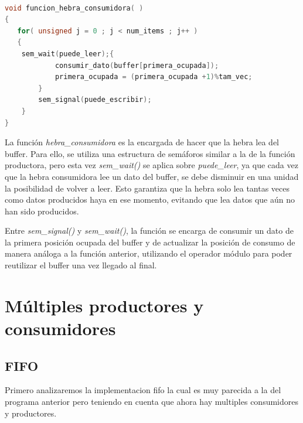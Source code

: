 \documentclass{article}
\begin{document}
\begin{lstlisting}[language=C++,caption=función hebra consumidora ]

void funcion_hebra_consumidora( )
{
   for( unsigned j = 0 ; j < num_items ; j++ )
   {
	sem_wait(puede_leer);{
	        consumir_dato(buffer[primera_ocupada]);
			primera_ocupada = (primera_ocupada +1)%tam_vec;
		}
		sem_signal(puede_escribir);
    }
}
\end{lstlisting}

La función \textit{hebra\_consumidora} es la encargada de hacer que la hebra lea del buffer. Para ello, se utiliza una estructura de semáforos similar a la de la función productora, pero esta vez \textit{sem\_wait()} se aplica sobre \textit{puede\_leer}, ya que cada vez que la hebra consumidora lee un dato del buffer, se debe disminuir en una unidad la posibilidad de volver a leer. Esto garantiza que la hebra solo lea tantas veces como datos producidos haya en ese momento, evitando que lea datos que aún no han sido producidos.

Entre \textit{sem\_signal()} y \textit{sem\_wait()}, la función se encarga de consumir un dato de la primera posición ocupada del buffer y de actualizar la posición de consumo de manera análoga a la función anterior, utilizando el operador módulo para poder reutilizar el buffer una vez llegado al final.



\section{Múltiples productores y consumidores}

\subsection{FIFO}
Primero analizaremos la implementacion fifo la cual es muy parecida a la del programa anterior pero teniendo en cuenta que ahora hay multiples consumidores y productores.
\end{document}
